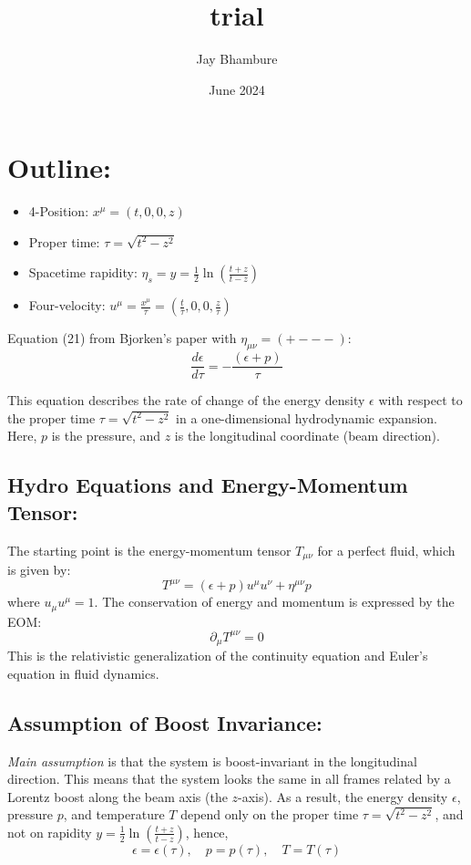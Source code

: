 \documentclass{article}
\title{trial}
\author{Jay Bhambure}
\date{June 2024}
\begin{document}
\section{Outline:}
\begin{itemize}
    \item 4-Position: $x^{\mu} = (t,0,0,z)$
    \item Proper time: $\tau = \sqrt{t^2 - z^2}$
    \item Spacetime rapidity: $\eta_{s} = y = \frac{1}{2}\ln\left(\frac{t+z}{t-z}\right)$
    \item Four-velocity: $u^\mu = \frac{x^\mu}{\tau} = \left(\frac{t}{\tau}, 0, 0, \frac{z}{\tau}\right)$
\end{itemize}

Equation (21) from Bjorken's paper with $\eta_{\mu\nu}=(+---)$:
\begin{equation}
    \frac{d\epsilon}{d\tau} = -\frac{(\epsilon + p)}{\tau}
\end{equation}

This equation describes the rate of change of the energy density $\epsilon$ with respect to the proper time $\tau = \sqrt{t^2 - z^2}$ in a one-dimensional hydrodynamic expansion. Here, $p$ is the pressure, and $z$ is the longitudinal coordinate (beam direction).

\subsection{Hydro Equations and Energy-Momentum Tensor:}
The starting point is the energy-momentum tensor \(T_{\mu\nu}\) for a perfect fluid, which is given by:
\begin{equation}
    T^{\mu\nu} = (\epsilon + p) u^\mu u^\nu + \eta^{\mu\nu} p
\end{equation}
where $u_\mu u^\mu = 1$. The conservation of energy and momentum is expressed by the EOM:
\begin{equation}
    \partial_\mu T^{\mu\nu} = 0
\end{equation}
This is the relativistic generalization of the continuity equation and Euler's equation in fluid dynamics.

\subsection{Assumption of Boost Invariance:}
\textit{Main assumption} is that the system is boost-invariant in the longitudinal direction. This means that the system looks the same in all frames related by a Lorentz boost along the beam axis (the $z$-axis). As a result, the energy density $\epsilon$, pressure $p$, and temperature $T$ depend only on the proper time $\tau = \sqrt{t^2 - z^2}$, and not on rapidity $y = \frac{1}{2} \ln \left( \frac{t + z}{t - z} \right)$, hence,
\[
\epsilon = \epsilon(\tau), \quad p = p(\tau), \quad T = T(\tau)
\]
\end{document}
